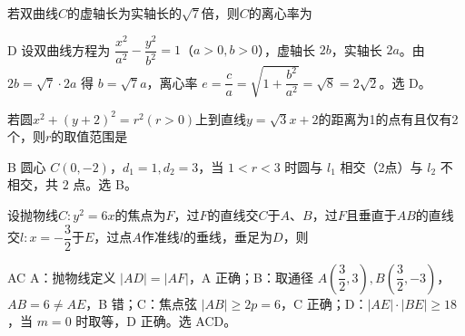 


\begin{question}
若双曲线$C$的虚轴长为实轴长的$\sqrt{7}$倍，则$C$的离心率为\choiceBox
{}
\end{question}
\begin{answer}{D}
设双曲线方程为 $\dfrac{x^2}{a^2}-\dfrac{y^2}{b^2}=1$（$a>0,b>0$），虚轴长 $2b$，实轴长 $2a$。由 $2b=\sqrt{7}\cdot2a$ 得 $b=\sqrt{7}a$，离心率 $e=\dfrac{c}{a}=\sqrt{1+\dfrac{b^2}{a^2}}=\sqrt{8}=2\sqrt{2}$。选 D。
\end{answer}

\begin{question}
若圆$x^2+(y+2)^2=r^2(r>0)$上到直线$y=\sqrt{3}x+2$的距离为1的点有且仅有2个，则$r$的取值范围是\choiceBox



\end{question}
\begin{answer}{B}
圆心 $C(0,-2)$，$d_1=1,d_2=3$，当 $1<r<3$ 时圆与 $l_1$ 相交（2点）与 $l_2$ 不相交，共 $2$ 点。选 B。
\end{answer}

\begin{question}
设抛物线$C:y^2=6x$的焦点为$F$，过$F$的直线交$C$于$A$、$B$，过$F$且垂直于$AB$的直线交$l:x=-\dfrac{3}{2}$于$E$，过点$A$作准线$l$的垂线，垂足为$D$，则\choiceBox



\end{question}
\begin{answer}{AC}
A：抛物线定义 $|AD|=|AF|$，A 正确；B：取通径 $A(\dfrac32,3),B(\dfrac32,-3)$，$AB=6\neq AE$，B 错；C：焦点弦 $|AB|\ge2p=6$，C 正确；D：$|AE|\cdot|BE|\ge18$，当 $m=0$ 时取等，D 正确。选 ACD。
\end{answer}

